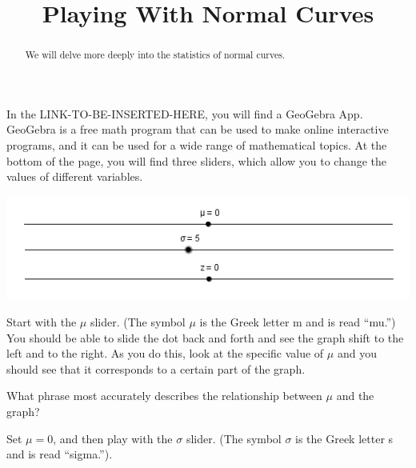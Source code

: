 \documentclass{ximera}
\title{Playing With Normal Curves}
\begin{document}
\begin{abstract}
We will delve more deeply into the statistics of normal curves.
\end{abstract}
\maketitle

In the LINK-TO-BE-INSERTED-HERE, you will find a GeoGebra App. GeoGebra is a free math program that can be used to make online interactive programs, and it can be used for a wide range of mathematical topics. At the bottom of the page, you will find three sliders, which allow you to change the values of different variables.

\begin{center}
\includegraphics[scale=0.75]{Sliders.png}
\end{center}

Start with the $\mu$ slider. (The symbol $\mu$ is the Greek letter m and is read ``mu.'') You should be able to slide the dot back and forth and see the graph shift to the left and to the right. As you do this, look at the specific value of $\mu$ and you should see that it corresponds to a certain part of the graph.

\begin{question}
What phrase most accurately describes the relationship between $\mu$ and the graph?
  \begin{solution}
    \begin{multiple-choice}
    \end{multiple-choice}
  \end{solution}
\end{question}

Set $\mu = 0$, and then play with the $\sigma$ slider. (The symbol $\sigma$ is the Greek letter s and is read ``sigma.''). 
\end{document}
